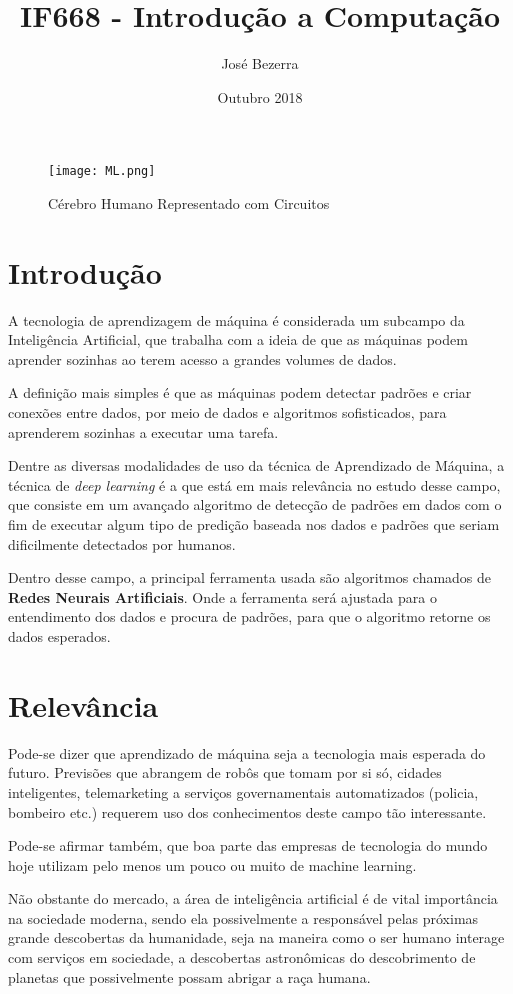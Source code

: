 \documentclass[10pt]{article}
\title{IF668 - Introdução a Computação}
\author{José Bezerra}
\date{Outubro 2018}
\begin{document}
\maketitle

\begin{figure}[h!]
\centering
\texttt{[image: ML.png]}
\caption{Cérebro Humano Representado com Circuitos}
\label{fig:universe}
\end{figure}

\section{Introdução}
A tecnologia de aprendizagem de máquina é considerada um subcampo da Inteligência Artificial, que trabalha com a ideia de que as máquinas podem aprender sozinhas ao terem acesso a grandes volumes de dados.\citep{DI-UFPE}

A definição mais simples é que as máquinas podem detectar padrões e criar conexões entre dados, por meio de dados e algoritmos sofisticados, para aprenderem sozinhas a executar uma tarefa.\citep{NEWS}

Dentre as diversas modalidades de uso da técnica de Aprendizado de Máquina, a técnica de \textit{deep learning} é a que está em mais relevância no estudo desse campo, que consiste em um avançado algoritmo de detecção de padrões em dados com o fim de executar algum tipo de predição baseada nos dados e padrões que seriam dificilmente detectados por humanos.

Dentro desse campo, a principal ferramenta usada são algoritmos chamados de \textbf{Redes Neurais Artificiais}. Onde a ferramenta será ajustada para o entendimento dos dados e procura de padrões, para que o algoritmo retorne os dados esperados.

\section{Relevância}
Pode-se dizer que aprendizado de máquina seja a tecnologia mais esperada do futuro. Previsões que abrangem de robôs que tomam por si só, cidades inteligentes, telemarketing  a serviços governamentais automatizados (policia, bombeiro etc.) requerem uso dos conhecimentos deste campo tão interessante.

Pode-se afirmar também, que boa parte das empresas de tecnologia do mundo hoje utilizam pelo menos um pouco ou muito de machine learning. 

Não obstante do mercado, a área de inteligência artificial é de vital importância na sociedade moderna, sendo ela possivelmente a responsável pelas próximas grande descobertas da humanidade, seja na maneira como o ser humano interage com serviços em sociedade, a descobertas astronômicas do descobrimento de planetas que possivelmente possam abrigar a raça humana.
\citep{NASA}
\end{document}
